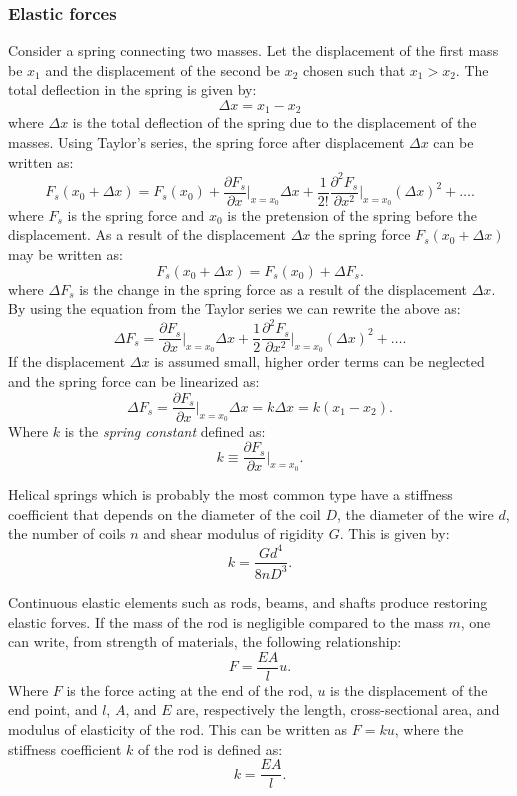 \subsubsection{Elastic forces}
Consider a spring connecting two masses. Let the displacement of the first mass be $x_1$ and the displacement of the second be $x_2$ chosen such that $x_1 > x_2$. The total deflection in the spring is given by:
\[ 
\Delta x = x_1 - x_2
\]
where $\Delta x$ is the total deflection of the spring due to the displacement of the masses. Using Taylor's series, the spring force after displacement $\Delta x$ can be written as:
\[ 
F_s \left( x_0 + \Delta x \right) = F_s (x_0) + \frac{\partial F_s}{\partial x} \bigg|_{x= x_0}\Delta x + \frac{1}{2!} \frac{\partial^2 F_s}{\partial x^2} \bigg|_{x = x_0} \left( \Delta x \right)^2 + \ldots 
.\]
where $F_s$ is the spring force and $x_0$ is the pretension of the spring before the displacement. As a result of the displacement $\Delta x$ the spring force $F_s (x_0 + \Delta x)$ may be written as:
\[ 
F_s \left( x_0 + \Delta x \right) = F_s \left( x_0 \right) + \Delta F_s
.\]
where $\Delta F_s$ is the change in the spring force as a result of the displacement $\Delta x$. By using the equation from the Taylor series we can rewrite the above as:
\[ 
\Delta F_s = \frac{\partial F_s}{\partial x} \bigg|_{x = x_0} \Delta x + \frac{1}{2} \frac{\partial^2 F_s}{\partial x^2} \bigg|_{x = x_{0}} \left( \Delta x \right)^2 + \ldots
.\]
If the displacement $\Delta x$ is assumed small, higher order terms can be neglected and the spring force can be linearized as:
\[ 
\Delta F_s = \frac{\partial F_s}{\partial x} \bigg|_{x = x_0} \Delta x = k \Delta x = k \left( x_1 - x_2 \right)
.\]
Where $k$ is the \textit{spring constant} defined as:
\[ 
k \equiv \frac{\partial F_s}{\partial x} \bigg|_{x = x_{0} }
.\]

Helical springs which is probably the most common type have a stiffness coefficient that depends on the diameter of the coil $D$, the diameter of the wire $d$, the number of coils $n$ and shear modulus of rigidity $G$. This is given by:
\[ 
k = \frac{G d^{4}}{8n D^3}
.\]

Continuous elastic elements such as rods, beams, and shafts produce restoring elastic forves. If the mass of the rod is negligible compared to the mass $m$, one can write, from strength of materials, the following relationship:
\[ 
F = \frac{EA}{l}u
.\]
Where $F$ is the force acting at the end of the rod, $u$ is the displacement of the end point, and $l$, $A$, and $E$ are, respectively the length, cross-sectional area, and modulus of elasticity of the rod. This can be written as $F  = k u$, where the stiffness coefficient $k$ of the rod is defined as:
\[ 
k = \frac{EA}{l}
.\]

